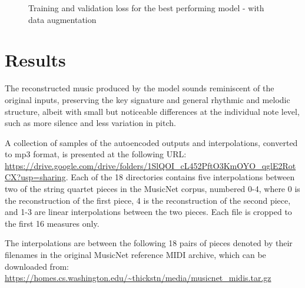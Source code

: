 \documentclass[sigconf,authorversion]{acmart}
\begin{document}
\begin{figure}[htbp]
    \begin{center}
        \scalebox{0.5}{}
    \end{center}
    \caption{Training and validation loss for the best performing model - with data augmentation}
    \label{loss_augment}
\end{figure}


\section{Results}

The reconstructed music produced by the model sounds reminiscent of
the original inputs, preserving the key signature and general rhythmic
and melodic structure, albeit with small but noticeable differences at
the individual note level, such as more silence and less variation in
pitch.

A collection of samples of the autoencoded outputs and interpolations,
converted to mp3 format, is presented at the following URL:
\url{https://drive.google.com/drive/folders/1SlQOI_cL452PftO3KmOYO_qglE2RotCX?usp=sharing}.
Each of the 18 directories contains five interpolations between two of
the string quartet pieces in the MusicNet corpus, numbered 0-4, where
0 is the reconstruction of the first piece, 4 is the reconstruction of
the second piece, and 1-3 are linear interpolations between the two
pieces. Each file is cropped to the first 16 measures only.

The interpolations are between the following 18 pairs of pieces
denoted by their filenames in the original MusicNet reference MIDI
archive, which can be downloaded from:
\url{https://homes.cs.washington.edu/~thickstn/media/musicnet_midis.tar.gz}
\end{document}
